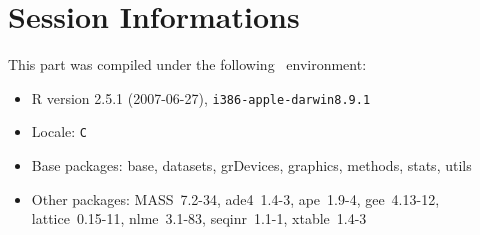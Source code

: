 \documentclass{article}
\begin{document}
\section{Session Informations}

This part was compiled under the following \Rlogo{}~environment:

\begin{itemize}
  \item R version 2.5.1 (2007-06-27), \verb|i386-apple-darwin8.9.1|
  \item Locale: \verb|C|
  \item Base packages: base, datasets, grDevices, graphics, methods,
    stats, utils
  \item Other packages: MASS~7.2-34, ade4~1.4-3, ape~1.9-4,
    gee~4.13-12, lattice~0.15-11, nlme~3.1-83, seqinr~1.1-1,
    xtable~1.4-3
\end{itemize}

%
%
\clearpage
{}


\end{document}
